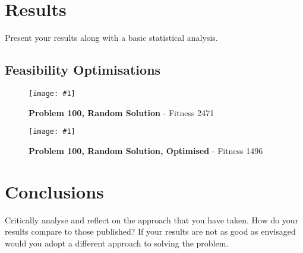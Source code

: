 \documentclass[14pt]{acmsiggraph}
\newcommand{\figuremacroW}[4]{
	\begin{figure}[h] %
		\centering
		\texttt{[image: \#1]}
		\caption[#2]{\textbf{#2} - #3}
		\label{fig:#1}
	\end{figure}
}
\begin{document}
\section{Results}
Present your results along with a basic statistical analysis.

\subsection{Feasibility Optimisations}
\figuremacroW
{p100rnd}
{Problem 100, Random Solution}
{Fitness 2471}
{1.0}
\figuremacroW
{p100rndopt}
{Problem 100, Random Solution, Optimised}
{Fitness 1496}
{1.0}


\lipsum[7]
\section{Conclusions}
Critically analyse and reflect on the approach that you have taken. How do your results compare to those published? If your results are not as good as envisaged would you adopt a different approach to solving the problem.

\lipsum[7]



\end{document}
